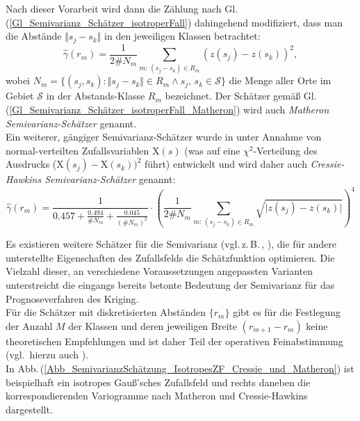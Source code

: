 Nach dieser Vorarbeit wird dann die Zählung nach 
Gl.\,(\ref{Gl_Semivarianz_Schätzer_isotroperFall}) dahingehend
modifiziert, dass man die Abstände $\Vert s_j - s_k \Vert$ in den 
jeweiligen Klassen betrachtet:
\begin{equation}
\label{Gl_Semivarianz_Schätzer_isotroperFall_Matheron}
\hat{\gamma}(r_m)= \frac{1}{2\#N_m} \sum_{m:\,(s_j-s_k) \in R_m} 
\left( z(s_j) - z(s_k)\right)^2,
\end{equation}
wobei 
$N_m = \lbrace (s_j, s_k) : \Vert s_j - s_k\Vert \in R_m 
\wedge s_j,\,s_k \in \mathcal{S}\rbrace$ die Menge aller Orte 
im Gebiet $\mathcal{S}$ in der Abstands-Klasse $R_m$ bezeichnet.
Der Schätzer gemäß 
Gl.\,(\ref{Gl_Semivarianz_Schätzer_isotroperFall_Matheron})
wird auch \textit{Matheron Semivarianz-Schätzer} 
genannt. \\

Ein weiterer, gängiger 
Semivarianz-Schätzer wurde in 
\cite{Cressie1980} unter Annahme von normal-verteilten 
Zufallsvariablen $\mathrm{X}(s)$ (was auf eine 
$\chi^2$-Verteilung des Ausdrucks ($\mathrm{X}(s_j) - 
\mathrm{X}(s_k))^2$ führt) entwickelt 
und wird daher 
auch \textit{Cressie-Hawkins Semivarianz-Schätzer} genannt:
\begin{equation}
\label{Gl_Semivarianz_Schätzer_isotroperFall_Cressie}
\hat{\gamma}(r_m)= 
\frac{1}
{0.457+ \frac{0.494}{\#N_m} + \frac{0.045}{(\#N_m)^2}} \cdot
\left( \frac{1}{2\#N_m} \sum_{m:\,(s_j-s_k) \in R_m} 
\sqrt{ \vert z(s_j) - z(s_k)\vert }\right)^4
\end{equation}

Es existieren weitere Schätzer für die Semivarianz 
(vgl.\,z.\,B.\,\cite{Dowd1984}, \cite{Genton1998}), die für andere 
unterstellte Eigenschaften des Zufallsfelds die Schätzfunktion optimieren.
Die Vielzahl dieser, an verschiedene Voraussetzungen angepassten Varianten
unterstreicht die eingangs bereits betonte Bedeutung der Semivarianz 
für das Prognoseverfahren des Kriging. \\

Für die Schätzer mit diskretisierten Abständen 
$\lbrace r_m \rbrace$ gibt es für die Festlegung der 
Anzahl $M$ der Klassen und deren jeweiligen Breite 
$(r_{m+1} - r_m)$ keine theoretischen Empfehlungen und ist
daher Teil der operativen Feinabstimmung (vgl.\, hierzu auch 
\cite[S.\,111]{Benndorf2023}).\\

In Abb.\,(\ref{Abb_SemivarianzSchätzung_IsotropesZF_Cressie_und_Matheron}) 
ist beispielhaft ein isotropes Gauß'sches Zufallsfeld und rechts daneben die korrespondierenden Variogramme nach Matheron und Cressie-Hawkins dargestellt.\\

